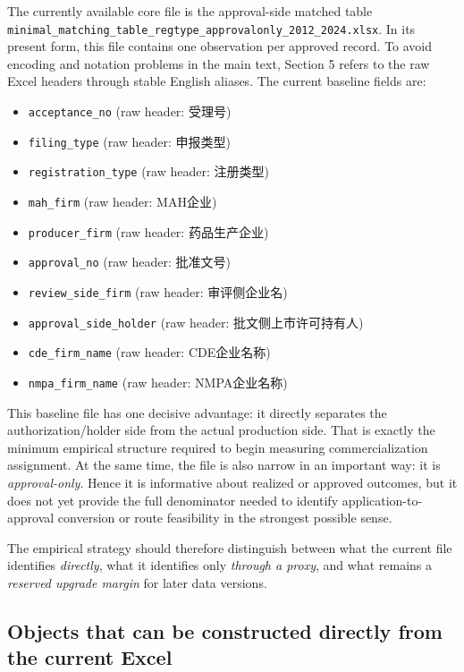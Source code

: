 \documentclass[12pt]{article}
\begin{document}
The currently available core file is the approval-side matched table
\texttt{minimal\_matching\_table\_regtype\_approvalonly\_2012\_2024.xlsx}. In its present form, this
file contains one observation per approved record. To avoid encoding and notation problems in the
main text, Section 5 refers to the raw Excel headers through stable English aliases. The current
baseline fields are:
\begin{itemize}[nosep]
\item \texttt{acceptance\_no} (raw header: 受理号)
\item \texttt{filing\_type} (raw header: 申报类型)
\item \texttt{registration\_type} (raw header: 注册类型)
\item \texttt{mah\_firm} (raw header: MAH企业)
\item \texttt{producer\_firm} (raw header: 药品生产企业)
\item \texttt{approval\_no} (raw header: 批准文号)
\item \texttt{review\_side\_firm} (raw header: 审评侧企业名)
\item \texttt{approval\_side\_holder} (raw header: 批文侧上市许可持有人)
\item \texttt{cde\_firm\_name} (raw header: CDE企业名称)
\item \texttt{nmpa\_firm\_name} (raw header: NMPA企业名称)
\end{itemize}

This baseline file has one decisive advantage: it directly separates the authorization/holder side
from the actual production side. That is exactly the minimum empirical structure required to begin
measuring commercialization assignment. At the same time, the file is also narrow in an important
way: it is \emph{approval-only}. Hence it is informative about realized or approved outcomes, but
it does not yet provide the full denominator needed to identify application-to-approval conversion
or route feasibility in the strongest possible sense.

The empirical strategy should therefore distinguish between what the current file identifies
\emph{directly}, what it identifies only \emph{through a proxy}, and what remains a \emph{reserved
upgrade margin} for later data versions.

\subsection{Objects that can be constructed directly from the current Excel}
\end{document}
